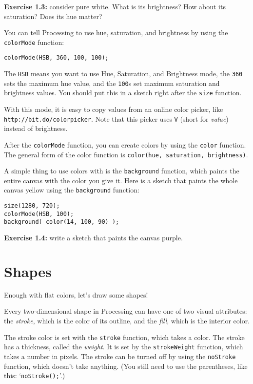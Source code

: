 \documentclass[
]{leaflet}
\begin{document}
\textbf{Exercise 1.3:} consider pure white. What is its brightness? How about its saturation? Does its hue matter?

You can tell Processing to use hue, saturation, and brightness by using the \texttt{colorMode} function:
\begin{lstlisting}
colorMode(HSB, 360, 100, 100);
\end{lstlisting}
\vspace{-0.5em}
The \texttt{HSB} means you want to use Hue, Saturation, and Brightness mode, the \texttt{360} sets the maximum hue value, and the \texttt{100}s set maximum saturation and brightness values.
You should put this in a sketch right after the \texttt{size} function.

With this mode, it is easy to copy values from an online color picker, like \texttt{http://bit.do/colorpicker}.
Note that this picker uses \texttt{V} (short for \textit{value}) instead of brightness.

After the \texttt{colorMode} function, you can create colors by using the \texttt{color} function.
The general form of the color function is \texttt{color(hue, saturation, brightness)}.

A simple thing to use colors with is the \texttt{background} function, which paints the entire canvas with the color you give it.
Here is a sketch that paints the whole canvas yellow using the \texttt{background} function:

\begin{lstlisting}
size(1280, 720);
colorMode(HSB, 100);
background( color(14, 100, 90) );
\end{lstlisting}

\textbf{Exercise 1.4:} write a sketch that paints the canvas purple.

\section{Shapes}

Enough with flat colors, let's draw some shapes!

Every two-dimensional shape in Processing can have one of two visual attributes: the \textit{stroke}, which is the color of its outline, and the \textit{fill}, which is the interior color.

The stroke color is set with the \texttt{stroke} function, which takes a color.
The stroke has a thickness, called the \textit{weight}.
It is set by the \texttt{strokeWeight} function, which takes a number in pixels.
The stroke can be turned off by using the \texttt{noStroke} function, which doesn't take anything.
(You still need to use the parentheses, like this: `\texttt{noStroke();}'.)
\end{document}

